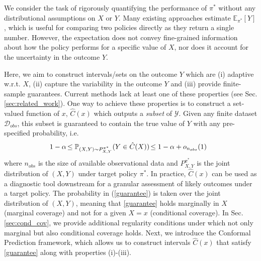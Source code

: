 

We consider the task of rigorously quantifying the performance of $\pi^*$ without any distributional assumptions on $X$ or $Y$. Many existing approaches estimate $\mathbb{E}_{\pi^*}[Y]$, which is useful for comparing two policies directly as they return a single number. However, the expectation does not convey fine-grained information about how the policy performs for a specific value of $X$, nor does it account for the uncertainty in the outcome $Y$.

Here, we aim to construct intervals/sets on the outcome $Y$ which are (i) adaptive w.r.t. $X$, (ii) capture the variability in the outcome $Y$ and (iii) provide finite-sample guarantees. Current methods lack at least one of these properties (see Sec. \ref{sec:related_work}). One way to achieve these properties is to construct a set-valued function of $x$, $\hat{C}(x)$ which outputs a \emph{subset} of $\mathcal{Y}$. Given any finite dataset $\mathcal{D}_{obs}$, this subset is guaranteed to contain the true value of $Y$ with any pre-specified probability, i.e.
\begin{align}
     \hspace{-0.24cm}1- \alpha \hspace{-0.05cm}\leq  \tarprob(Y \in \hat{C}(X)) \hspace{-0.05cm}\leq 1- \alpha + o_{n_{obs}}(1) \label{guarantee}
\end{align}
where $n_{obs}$ is the size of available observational data and $P^{\pi^*}_{X,Y}$ is the joint distribution of $(X,Y)$ under target policy $\pi^*$. In practice, $\hat{C}(x)$ can be used as a diagnostic tool downstream for a granular assessment of likely outcomes under a target policy. The probability in (\ref{guarantee}) is taken over the joint distribution of $(X, Y)$, meaning that \eqref{guarantee} holds marginally in $X$ (marginal coverage) and not for a given $X=x$ (conditional coverage). In Sec. \ref{sec:cond_cov}, we provide additional regularity conditions under which not only marginal but also conditional coverage holds. Next, we introduce the Conformal Prediction framework, which allows us to construct intervals $\hat{C}(x)$ that satisfy \eqref{guarantee} along with properties (i)-(iii). 


